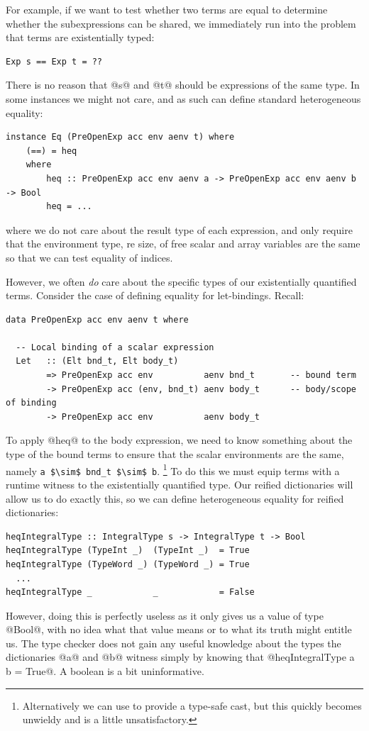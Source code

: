 For example, if we want to test whether two terms are equal to determine whether
the subexpressions can be shared, we immediately run into the problem that terms
are existentially typed:
%
\begin{lstlisting}[style=haskell]
Exp s == Exp t = ??
\end{lstlisting}
%
There is no reason that @s@ and @t@ should be expressions of the same
type. In some instances we might not care, and as such can define standard
heterogeneous equality:
%
\begin{lstlisting}[style=haskell]
instance Eq (PreOpenExp acc env aenv t) where
    (==) = heq
    where
        heq :: PreOpenExp acc env aenv a -> PreOpenExp acc env aenv b -> Bool
        heq = ...
\end{lstlisting}
%
where we do not care about the result type of each expression, and only require
that the environment type, re size, of free scalar and array variables are the
same so that we can test equality of  indices.

However, we often \emph{do} care about the specific types of our existentially
quantified terms. Consider the case of defining equality for let-bindings.
Recall:
%
\begin{lstlisting}[style=haskell]
data PreOpenExp acc env aenv t where

  -- Local binding of a scalar expression
  Let   :: (Elt bnd_t, Elt body_t)
        => PreOpenExp acc env          aenv bnd_t       -- bound term
        -> PreOpenExp acc (env, bnd_t) aenv body_t      -- body/scope of binding
        -> PreOpenExp acc env          aenv body_t
\end{lstlisting}
%
To apply @heq@ to the body expression, we need to know something about
the type of the bound terms to ensure that the scalar environments are the same,
namely \lstinline[style=inline,mathescape]{a $\sim$ bnd_t $\sim$ b}.%
\footnote{Alternatively we can use  to provide a
type-safe cast, but this quickly becomes unwieldy and is a little
unsatisfactory.} To do this we must equip terms with a runtime witness to the
existentially quantified type. Our reified dictionaries will allow us to do
exactly this, so we can define heterogeneous equality for reified dictionaries:
%
\begin{lstlisting}[style=haskell]
heqIntegralType :: IntegralType s -> IntegralType t -> Bool
heqIntegralType (TypeInt _)  (TypeInt _)  = True
heqIntegralType (TypeWord _) (TypeWord _) = True
  ...
heqIntegralType _            _            = False
\end{lstlisting}
%
However, doing this is perfectly useless as it only gives us a value of type
@Bool@, with no idea what that value means or to what its truth might
entitle us. The type checker does not gain any useful knowledge about the types
the dictionaries @a@ and @b@ witness simply by knowing that
@heqIntegralType a b = True@. A boolean is a bit uninformative.

